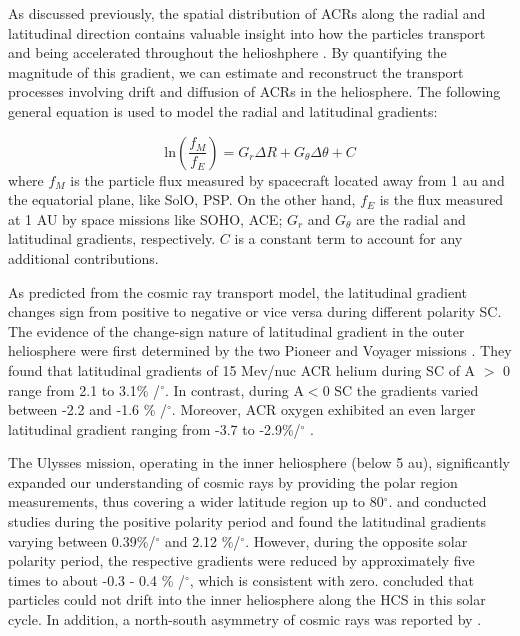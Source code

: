 As discussed previously, the spatial distribution of \acp{ACR} along the radial and latitudinal direction contains valuable insight into how the particles transport and being accelerated throughout the helioshphere \citep{Rankin2021ApJ}. By quantifying the magnitude of this gradient, we can estimate and reconstruct the transport processes involving drift and diffusion of \acp{ACR} in the heliosphere. The following general equation is used to model the radial and latitudinal gradients:

\begin{equation}
	\mathrm{ln}(\frac{f_{M}}{f_{E}}) = G_r \Delta R  + G_{\theta} \Delta \theta + C
\end{equation}
where $f_{M}$ is the particle flux measured by spacecraft located away from 1 au and the equatorial plane, like \ac{SolO}, \ac{PSP}. On the other hand, $f_{E}$ is the flux measured at 1 AU by space missions like \ac{SOHO}, \ac{ACE}; $G_r$ and $G_{\theta}$ are the radial and latitudinal gradients, respectively. $C$ is a constant term to account for any additional contributions.


As predicted from the cosmic ray transport model, the latitudinal gradient changes sign from positive to negative or vice versa during different polarity \ac{SC}. The evidence of the change-sign nature of latitudinal gradient in the outer heliosphere were first determined by the two Pioneer and Voyager missions \citep{Mckibben1979ApJ, Cummings1987GeoRL, Christon1986JGR}. They found that latitudinal gradients of 15 Mev/nuc \ac{ACR} helium during \ac{SC} of A $>$ 0 range from 2.1 to 3.1\% /$^\circ$. In contrast, during A$<$0 \ac{SC} the gradients varied between -2.2 and -1.6 \% /$^\circ$. Moreover, \ac{ACR} oxygen exhibited an even larger latitudinal gradient ranging from -3.7 to -2.9\%/$^\circ$ \citep{Cummings1987GeoRL}.

The Ulysses mission, operating in the inner heliosphere (below 5 au), significantly expanded our understanding of cosmic rays by providing the polar region measurements, thus covering a wider latitude region up to 80$^\circ$. \citet{Lanzerotti1995GeoRL} and \citet{Heber1998JGR} conducted studies during the positive polarity period and found the latitudinal gradients varying between 0.39\%/$^\circ$ and 2.12 \%/$^\circ$. However, during the opposite solar polarity period, the respective gradients were reduced by approximately five times to about -0.3 - 0.4 \% /$^\circ$, which is consistent with zero. \citet{Cummings2009GeoRL} concluded that particles could not drift into the inner heliosphere along the \ac{HCS} in this solar cycle. In addition, a north-south asymmetry of cosmic rays was reported by \citet{Simpson1996ApJ}.


